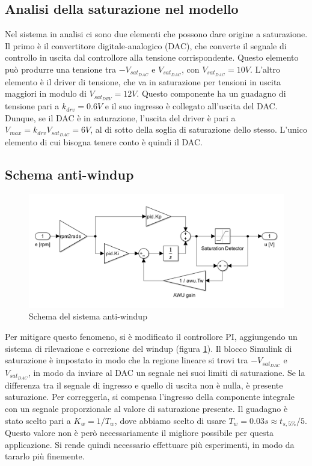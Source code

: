 \documentclass[a4paper, 11pt, Arial]{article}
\begin{document}
\subsection{Analisi della saturazione nel modello}
Nel sistema in analisi ci sono due elementi che possono dare origine a saturazione. Il primo è il convertitore digitale-analogico (DAC), che converte il segnale di controllo in uscita dal controllore alla tensione corrispondente. Questo elemento può produrre una tensione tra $-V_{sat_{DAC}}$ e $V_{sat_{DAC}}$, con $V_{sat_{DAC}} = 10V$. L'altro elemento è il driver di tensione, che va in saturazione per tensioni in uscita maggiori in modulo di $V_{sat_{DRV}} = 12V$. Questo componente ha un guadagno di tensione pari a $k_{drv} = 0.6V$ e il suo ingresso è collegato all'uscita del DAC. Dunque, se il DAC è in saturazione, l'uscita del driver è pari a $V_{max} = k_{drv} V_{sat_{DAC}} = 6V$, al di sotto della soglia di saturazione dello stesso. L'unico elemento di cui bisogna tenere conto è quindi il DAC.

\subsection{Schema anti-windup}
\begin{figure}[H]
    \centering
    \includegraphics[width=0.7\linewidth]{Images/awu.png}
    \caption{Schema del sistema anti-windup}
    \label{sim:awu}
\end{figure}
Per mitigare questo fenomeno, si è modificato il controllore PI, aggiungendo un sistema di rilevazione e correzione del windup (figura \ref{sim:awu}). Il blocco Simulink di saturazione è impostato in modo che la regione lineare si trovi tra $-V_{sat_{DAC}}$ e $V_{sat_{DAC}}$, in modo da inviare al DAC un segnale nei suoi limiti di saturazione. Se la differenza tra il segnale di ingresso e quello di uscita non è nulla, è presente saturazione. Per correggerla, si compensa l'ingresso della componente integrale con un segnale proporzionale al valore di saturazione presente. Il guadagno è stato scelto pari a $K_{w} = 1 / T_{w}$, dove abbiamo scelto di usare $T_{w} = 0.03s \approx t_{s, 5\%} / 5$. Questo valore non è però necessariamente il migliore possibile per questa applicazione. Si rende quindi necessario effettuare più esperimenti, in modo da tararlo più finemente.
\end{document}
